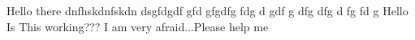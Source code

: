 \documentclass[12pt, a4paper]{article}
\begin{document}
Hello there
dnfhskdnfskdn
dsgfdgdf
gfd
gfgdfg
fdg
d
gdf
g
dfg
dfg
d
fg
fd
g
Hello Is This working???
I am very afraid...Please help me
\end{document}
